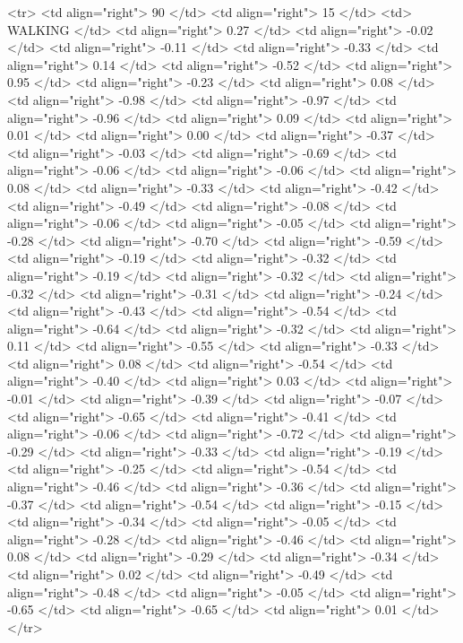   <tr> <td align="right"> 90 </td> <td align="right">  15 </td> <td> WALKING </td> <td align="right"> 0.27 </td> <td align="right"> -0.02 </td> <td align="right"> -0.11 </td> <td align="right"> -0.33 </td> <td align="right"> 0.14 </td> <td align="right"> -0.52 </td> <td align="right"> 0.95 </td> <td align="right"> -0.23 </td> <td align="right"> 0.08 </td> <td align="right"> -0.98 </td> <td align="right"> -0.97 </td> <td align="right"> -0.96 </td> <td align="right"> 0.09 </td> <td align="right"> 0.01 </td> <td align="right"> 0.00 </td> <td align="right"> -0.37 </td> <td align="right"> -0.03 </td> <td align="right"> -0.69 </td> <td align="right"> -0.06 </td> <td align="right"> -0.06 </td> <td align="right"> 0.08 </td> <td align="right"> -0.33 </td> <td align="right"> -0.42 </td> <td align="right"> -0.49 </td> <td align="right"> -0.08 </td> <td align="right"> -0.06 </td> <td align="right"> -0.05 </td> <td align="right"> -0.28 </td> <td align="right"> -0.70 </td> <td align="right"> -0.59 </td> <td align="right"> -0.19 </td> <td align="right"> -0.32 </td> <td align="right"> -0.19 </td> <td align="right"> -0.32 </td> <td align="right"> -0.32 </td> <td align="right"> -0.31 </td> <td align="right"> -0.24 </td> <td align="right"> -0.43 </td> <td align="right"> -0.54 </td> <td align="right"> -0.64 </td> <td align="right"> -0.32 </td> <td align="right"> 0.11 </td> <td align="right"> -0.55 </td> <td align="right"> -0.33 </td> <td align="right"> 0.08 </td> <td align="right"> -0.54 </td> <td align="right"> -0.40 </td> <td align="right"> 0.03 </td> <td align="right"> -0.01 </td> <td align="right"> -0.39 </td> <td align="right"> -0.07 </td> <td align="right"> -0.65 </td> <td align="right"> -0.41 </td> <td align="right"> -0.06 </td> <td align="right"> -0.72 </td> <td align="right"> -0.29 </td> <td align="right"> -0.33 </td> <td align="right"> -0.19 </td> <td align="right"> -0.25 </td> <td align="right"> -0.54 </td> <td align="right"> -0.46 </td> <td align="right"> -0.36 </td> <td align="right"> -0.37 </td> <td align="right"> -0.54 </td> <td align="right"> -0.15 </td> <td align="right"> -0.34 </td> <td align="right"> -0.05 </td> <td align="right"> -0.28 </td> <td align="right"> -0.46 </td> <td align="right"> 0.08 </td> <td align="right"> -0.29 </td> <td align="right"> -0.34 </td> <td align="right"> 0.02 </td> <td align="right"> -0.49 </td> <td align="right"> -0.48 </td> <td align="right"> -0.05 </td> <td align="right"> -0.65 </td> <td align="right"> -0.65 </td> <td align="right"> 0.01 </td> </tr>

